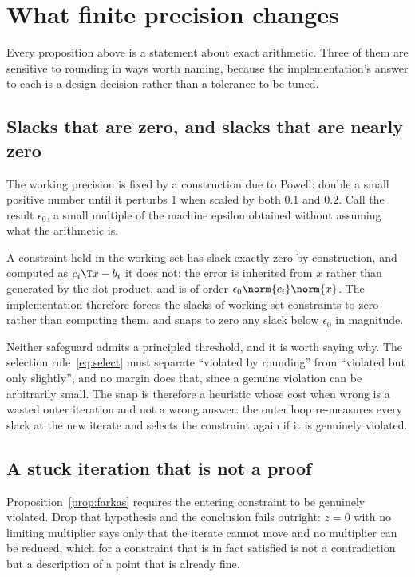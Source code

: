 \section{What finite precision changes}
\label{sec:arithmetic}

Every proposition above is a statement about exact arithmetic. Three of them are
sensitive to rounding in ways worth naming, because the implementation's answer to
each is a design decision rather than a tolerance to be tuned.

\subsection{Slacks that are zero, and slacks that are nearly zero}

The working precision is fixed by a construction due to Powell: double a small
positive number until it perturbs $1$ when scaled by both $0.1$ and $0.2$. Call
the result $\epsilon_0$, a small multiple of the machine epsilon obtained without
assuming what the arithmetic is.

A constraint held in the working set has slack exactly zero by construction, and
computed as $c_i\T x - b_i$ it does not: the error is inherited from $x$ rather
than generated by the dot product, and is of order
$\epsilon_0\norm{c_i}\norm{x}$. The implementation therefore forces the slacks of
working-set constraints to zero rather than computing them, and snaps to zero any
slack below $\epsilon_0$ in magnitude.

Neither safeguard admits a principled threshold, and it is worth saying why. The
selection rule~\eqref{eq:select} must separate ``violated by rounding'' from
``violated but only slightly'', and no margin does that, since a genuine violation
can be arbitrarily small. The snap is therefore a heuristic whose cost when wrong
is a wasted outer iteration and not a wrong answer: the outer loop re-measures
every slack at the new iterate and selects the constraint again if it is genuinely
violated.

\subsection{A stuck iteration that is not a proof}

Proposition~\ref{prop:farkas} requires the entering constraint to be genuinely
violated. Drop that hypothesis and the conclusion fails outright: $z = 0$ with no
limiting multiplier says only that the iterate cannot move and no multiplier can
be reduced, which for a constraint that is in fact satisfied is not a
contradiction but a description of a point that is already fine.

